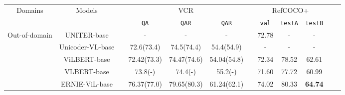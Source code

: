 \documentclass[letterpaper]{article} \usepackage{aaai21}  \usepackage{times}  \usepackage{helvet} \usepackage{courier}  \usepackage[hyphens]{url}  \usepackage{graphicx} \urlstyle{rm} \def\UrlFont{\rm}  \usepackage{natbib}  \usepackage{caption} \frenchspacing  \setlength{\pdfpagewidth}{8.5in}  \setlength{\pdfpageheight}{11in}  \usepackage{cite}
\begin{document}
\begin{table*}[t]
  \centering
  \renewcommand{\arraystretch}{1.2}
  \tabcolsep 6.4pt
   \small
 \begin{tabular}{llllllllllll}


\toprule[0.7pt]
\multicolumn{1}{c}{\multirow{2}{*}{Domains}} & \multicolumn{1}{c}{\multirow{2}{*}{Models}} & 
&
\multicolumn{3}{c}{VCR} &
&
\multicolumn{3}{c}{RefCOCO+} \\
\cline{8-10}
\cline{4-6}
 \multicolumn{1}{c}{} & \multicolumn{1}{c}{} & 
 \multicolumn{1}{c}{} & 

 \multicolumn{1}{c}{\texttt{QA}} & \multicolumn{1}{c}{\texttt{QAR}} & \multicolumn{1}{c}{\texttt{QAR}} &
 \multicolumn{1}{c}{} & 
 \multicolumn{1}{c}{\texttt{val}} &
 \multicolumn{1}{c}{\texttt{testA}} & \multicolumn{1}{c}{\texttt{testB}} \\
\hline

\multirow{7}{*}{Out-of-domain} & \multicolumn{1}{c}{UNITER-base} & \multicolumn{1}{c}{} & \multicolumn{1}{c}{-} & \multicolumn{1}{c}{-} & \multicolumn{1}{c}{-} & \multicolumn{1}{c}{} & \multicolumn{1}{c}{72.78} & \multicolumn{1}{c}{-} & \multicolumn{1}{c}{-} \\

& \multicolumn{1}{c}{Unicoder-VL-base} & \multicolumn{1}{c}{} & \multicolumn{1}{c}{72.6(73.4)} & \multicolumn{1}{c}{74.5(74.4)} & \multicolumn{1}{c}{54.4(54.9)} & \multicolumn{1}{c}{} & \multicolumn{1}{c}{-} & \multicolumn{1}{c}{-} & \multicolumn{1}{c}{-} \\

& \multicolumn{1}{c}{ViLBERT-base} & \multicolumn{1}{c}{} & \multicolumn{1}{c}{72.42(73.3)} & \multicolumn{1}{c}{74.47(74.6)} & \multicolumn{1}{c}{54.04(54.8)} & \multicolumn{1}{c}{} & \multicolumn{1}{c}{72.34} & \multicolumn{1}{c}{78.52} & \multicolumn{1}{c}{62.61} \\

& \multicolumn{1}{c}{VLBERT-base} & \multicolumn{1}{c}{} & \multicolumn{1}{c}{73.8(-)} & \multicolumn{1}{c}{74.4(-)} & \multicolumn{1}{c}{55.2(-)} & \multicolumn{1}{c}{} & \multicolumn{1}{c}{71.60} & \multicolumn{1}{c}{77.72} & \multicolumn{1}{c}{60.99} \\

& \multicolumn{1}{c}{ERNIE-ViL-base} & \multicolumn{1}{c}{} & \multicolumn{1}{c}{76.37(77.0)} & \multicolumn{1}{c}{79.65(80.3)} & \multicolumn{1}{c}{61.24(62.1)} & \multicolumn{1}{c}{} & \multicolumn{1}{c}{74.02} & \multicolumn{1}{c}{80.33} & \multicolumn{1}{c}{\textbf{64.74}} \\



\end{tabular}
\end{table*}
\end{document}

